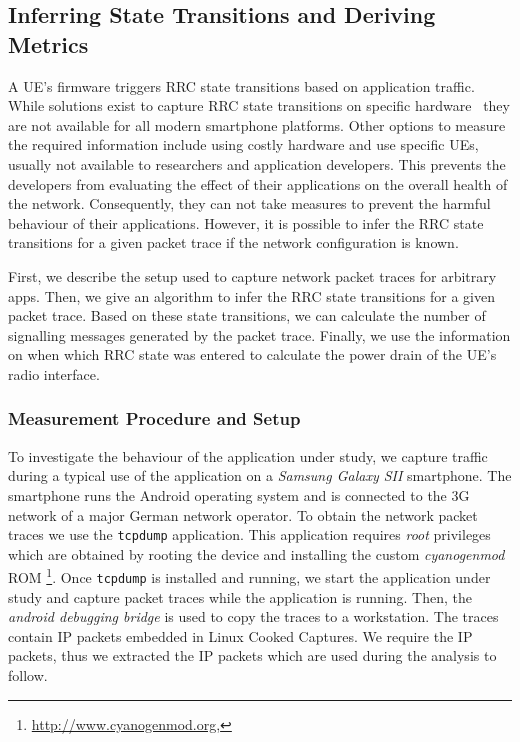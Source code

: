 \subsection{Inferring State Transitions and Deriving Metrics}\label{sec:network:network_traces:performance_evaluation}
A \gls{UE}’s firmware triggers \gls{RRC} state transitions based on application traffic.
While solutions exist to capture RRC state transitions on specific hardware~\cite{zayas2010} they are not available for all modern smartphone platforms.
Other options to measure the required information include using costly hardware and use specific \glspl{UE}, usually not available to researchers and application developers.
This prevents the developers from evaluating the effect of their applications on the overall health
of the network.
Consequently, they can not take measures to prevent the harmful behaviour of their applications.
However, it is possible to infer the \gls{RRC} state transitions for a given packet trace if the network configuration is known.

First, we describe the setup used to capture network packet traces for arbitrary apps.
Then, we give an algorithm to infer the \gls{RRC} state transitions for a given packet trace.
Based on these state transitions, we can calculate the number of signalling messages generated
by the packet trace.
Finally, we use the information on when which \gls{RRC} state was entered to calculate the power drain of the \gls{UE}’s radio interface.

\subsubsection*{Measurement Procedure and Setup}\label{sec:network:network_traces:performance_evaluation:measurement}
To investigate the behaviour of the application under study, we capture traffic during a typical use of the application on a \emph{Samsung Galaxy SII} smartphone.
The smartphone runs the Android operating system and is connected to the \gls{3G} network of a major German network operator.
To obtain the network packet traces we use the \texttt{tcpdump} application.
This application requires \emph{root} privileges which are obtained by rooting the device and installing the custom \emph{cyanogenmod} ROM \footnote{\url{http://www.cyanogenmod.org}, \accessed}.
Once \texttt{tcpdump} is installed and running, we start the application under study and capture packet traces while the application is running.
Then, the \emph{android debugging bridge} is used to copy the traces to a workstation.
The traces contain \gls{IP} packets embedded in Linux Cooked Captures.
We require the \gls{IP} packets, thus we extracted the \gls{IP} packets which are used during the analysis to follow.

